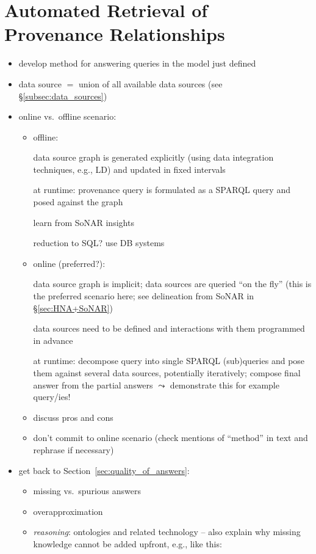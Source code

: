 \chapter{Automated Retrieval of Provenance Relationships}
\label{chap:retrieval}

\begin{itemize}
  \item
    develop method for answering queries in the model just defined
  \item
    data source $=$ union of all available data sources (see §\ref{subsec:data_sources})
  \item
    online vs.\ off{}line scenario:
    \begin{itemize}
      \item
        off{}line: 
        
        data source graph is generated explicitly (using data integration techniques, e.g., LD)
        and updated in fixed intervals
                
        at runtime: provenance query is formulated as a \gls{SPARQL} query and posed against the graph
        
        learn from SoNAR insights
        
        reduction to SQL? use DB systems
      \item
        online (preferred?):
        
        data source graph is implicit; data sources are queried \enquote{on the fly}
        (this is the preferred scenario here; see delineation from SoNAR in §\ref{sec:HNA+SoNAR})
        
        data sources need to be defined and
        interactions with them programmed in advance
        
        at runtime: decompose query into single \gls{SPARQL} (sub)queries and pose them against several data sources,
        potentially iteratively;
        compose final answer from the partial answers
        $\leadsto$ demonstrate this for example query/ies!
      \item
        discuss pros and cons
      \item
        don't commit to online scenario (check mentions of \enquote{method} in text and rephrase if necessary)
    \end{itemize}
  \item
    get back to Section~\ref{sec:quality_of_answers}:
    \begin{itemize}
      \item
        missing vs.\ spurious answers
      \item
        overapproximation
      \item
        \emph{reasoning}: ontologies and related technology -- also explain why
        missing knowledge cannot be added upfront, e.g., like this:
        

\end{itemize}
\end{itemize}
